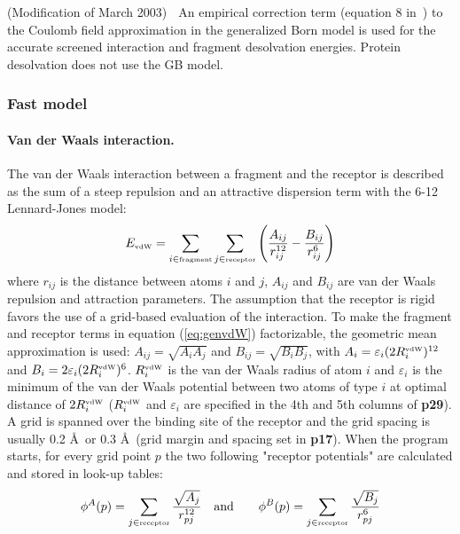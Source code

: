 \documentclass[a4paper,12pt,titlepage]{article}
\begin{document}
(Modification of March 2003) $\;$
An empirical correction term (equation 8 in~\cite{Lee:Novel}) 
to the Coulomb field approximation in the generalized Born model is used for the accurate screened interaction and fragment desolvation 
energies. Protein desolvation does not use the GB model.

\subsubsection{Fast model}
\label{fast:model}

\paragraph{Van der Waals interaction.}

The van der Waals interaction between a fragment and the receptor is described 
as the sum of a steep repulsion and an attractive dispersion term with the 6-12
Lennard-Jones model:
\begin{equation}
E_{\mbox{\tiny vdW}} = \sum_{i \in \mbox{\tiny fragment}} 
                       \sum_{j \in \mbox{\tiny receptor}} 
                       \left( \frac{A_{ij}}{r^{12}_{ij}} - 
                              \frac{B_{ij}}{r^{6}_{ij}}
                       \right)
\label{eq:genvdW}
\end{equation}
where $r_{ij}$ is the distance between atoms $i$ and $j$, $A_{ij}$ and $B_{ij}$ 
are van der Waals repulsion and attraction parameters. The assumption that the 
receptor is rigid favors the use of a grid-based evaluation of the 
interaction. To make the fragment and receptor terms in equation 
(\ref{eq:genvdW}) factorizable, the geometric mean approximation is 
used: 
$A_{ij}=\sqrt{A_i A_j}$ and $B_{ij}=\sqrt{B_i B_j}$, 
with $A_{i}=\varepsilon_i(2R_i^{\mbox{\tiny vdW}})^{12}$ and 
$B_{i}=2\varepsilon_i(2R_i^{\mbox{\tiny vdW}})^6$. $R_i^{\mbox{\tiny vdW}}$ is 
the van der Waals radius of atom $i$ and $\varepsilon_i$ is the minimum of the 
van der Waals potential between two atoms of type $i$ at optimal distance of 
$2R^{\mbox{\tiny vdW}}_i$ ($R_i^{\mbox{\tiny vdW}}$ and $\varepsilon_i$ are specified 
in the 4th and 5th columns of {\bf p29}). 
A grid is spanned over the binding site of the 
receptor and the grid spacing is usually 0.2 \AA\ or 0.3 \AA \, (grid margin and spacing 
set in {\bf p17}). 
When the program starts, for every grid point $p$
the two following "receptor potentials" are calculated and stored in
look-up tables: 
\begin{eqnarray}
\phi^A(p) = \sum_{j \in \mbox{\tiny receptor}} \frac{\sqrt{A_j}}{r_{pj}^{12}} 
& \,\,\,\,\,\, \mbox{and} \,\,\,\,\,\,  &
\phi^B(p) = \sum_{j \in \mbox{\tiny receptor}} \frac{\sqrt{B_j}}{r_{pj}^6} 
\label{eq:twoval}
\end{eqnarray}
\end{document}

